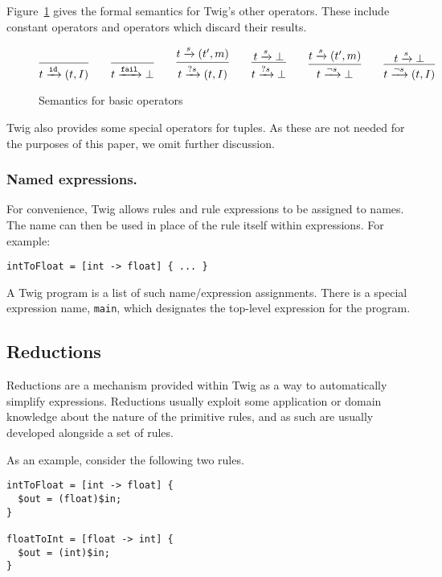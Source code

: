 Figure~\ref{semantics:basic} gives the formal semantics for Twig's other operators. These include constant operators and operators which discard their results.

\begin{figure}[ht]
\[
\infer{t \arr{\mathtt{id}} (t,I)}{}
\qquad
\infer{t \arr{\mathtt{fail}} \bot}{}
\qquad
\infer{t \arr{?s} (t,I)}{t \arr{s} (t',m)}
\qquad 
\infer{t \arr{?s} \bot}{t \arr{s} \bot}
\qquad
\infer{t \arr{\lnot s} \bot}{t \arr{s} (t',m)}
\qquad 
\infer{t \arr{\lnot s} (t,I)}{t \arr{s} \bot}
\]
\caption{Semantics for basic operators}
\label{semantics:basic}
\end{figure}

Twig also provides some special operators for tuples. As these are not needed for the purposes of this paper, we omit further discussion.

\subsubsection{Named expressions.}
\label{section:names}

For convenience, Twig allows rules and rule expressions to be assigned to names. The name can then be used in place of the rule itself within expressions. For example:

\begin{verbatim}
intToFloat = [int -> float] { ... }
\end{verbatim}

A Twig program is a list of such name/expression assignments. There is a special expression name, \texttt{main}, which designates the top-level expression for the program.

\subsection{Reductions}
\label{sec:reductions}

Reductions are a mechanism provided within Twig as a way to automatically simplify expressions. Reductions usually exploit some application or domain knowledge about the nature of the primitive rules, and as such are usually developed alongside a set of rules.

As an example, consider the following two rules.

\begin{verbatim}
intToFloat = [int -> float] {
  $out = (float)$in;
}

floatToInt = [float -> int] {
  $out = (int)$in;
}
\end{verbatim}

